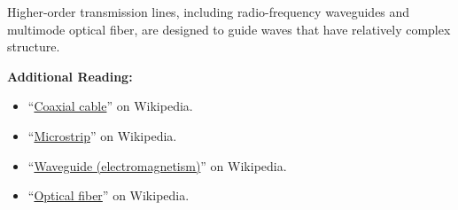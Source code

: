 \begin{mdframed}[backgroundcolor=yellow!20,nobreak=true] 
Higher-order transmission lines, including radio-frequency waveguides and multimode optical fiber, are designed to guide waves that have relatively complex structure.
\end{mdframed}


{\bf Additional Reading:}
\begin{itemize}
\item ``\href{https://en.wikipedia.org/wiki/Coaxial_cable}{Coaxial cable}'' on Wikipedia.
\item ``\href{https://en.wikipedia.org/wiki/Microstrip}{Microstrip}'' on Wikipedia.
\item ``\href{https://en.wikipedia.org/wiki/Waveguide_(electromagnetism)}{Waveguide (electromagnetism)}'' on Wikipedia.
\item ``\href{https://en.wikipedia.org/wiki/Optical_fiber}{Optical fiber}'' on Wikipedia.
\end{itemize}

       

